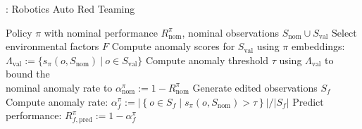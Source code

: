 \begin{algorithm}[h]
\caption{\redit: Robotics Auto Red Teaming}\label{alg:redit}
\begin{algorithmic}
 Policy $\pi$ with nominal performance $R_\text{nom}^\pi$, nominal observations $S_\text{nom} \cup S_\text{val}$
\State Select environmental factors $F$
\State \hspace{2pt}  Compute anomaly scores for $S_\text{val}$ using $\pi$ embeddings:
\State \hspace{15pt} $\Lambda_\text{val} := \{s_\pi(o, S_\text{nom}) \ | \ o \in S_\text{val} \}$
\State \hspace{2pt}  Compute anomaly threshold $\tau$ using $\Lambda_\text{val}$ to bound the \\ \hspace{2pt} nominal anomaly rate to $\alpha_\text{nom}^\pi := 1 - R_\text{nom}^\pi$ 
    \State Generate edited observations $S_f$ 
\State Compute anomaly rate: 
\State \hspace{5pt} $\alpha_f^\pi := \left| \left\{ o \in S_f \mid s_\pi(o, S_\text{nom}) > \tau \right\} \right| / |S_f|$
\State Predict performance:
\State \hspace{5pt} $R_{f, \text{pred}}^\pi := 1 - \alpha_f^\pi$
\EndFor

\end{algorithmic}
\end{algorithm}